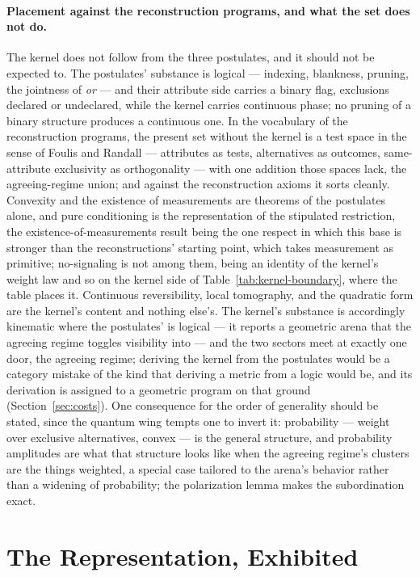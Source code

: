 \paragraph{Placement against the reconstruction programs, and what the set does not do.} The kernel does not follow from the three postulates, and it should not be expected to. The postulates' substance is logical --- indexing, blankness, pruning, the jointness of \emph{or} --- and their attribute side carries a binary flag, exclusions declared or undeclared, while the kernel carries continuous phase; no pruning of a binary structure produces a continuous one. In the vocabulary of the reconstruction programs, the present set without the kernel is a test space in the sense of Foulis and Randall --- attributes as tests, alternatives as outcomes, same-attribute exclusivity as orthogonality --- with one addition those spaces lack, the agreeing-regime union; and against the reconstruction axioms it sorts cleanly. Convexity and the existence of measurements are theorems of the postulates alone, and pure conditioning is the representation of the stipulated restriction, the existence-of-measurements result being the one respect in which this base is stronger than the reconstructions' starting point, which takes measurement as primitive; no-signaling is not among them, being an identity of the kernel's weight law and so on the kernel side of Table~\ref{tab:kernel-boundary}, where the table places it. Continuous reversibility, local tomography, and the quadratic form are the kernel's content and nothing else's. The kernel's substance is accordingly kinematic where the postulates' is logical --- it reports a geometric arena that the agreeing regime toggles visibility into --- and the two sectors meet at exactly one door, the agreeing regime; deriving the kernel from the postulates would be a category mistake of the kind that deriving a metric from a logic would be, and its derivation is assigned to a geometric program on that ground (Section~\ref{sec:costs}). One consequence for the order of generality should be stated, since the quantum wing tempts one to invert it: probability --- weight over exclusive alternatives, convex --- is the general structure, and probability amplitudes are what that structure looks like when the agreeing regime's clusters are the things weighted, a special case tailored to the arena's behavior rather than a widening of probability; the polarization lemma makes the subordination exact.

\section{The Representation, Exhibited}\label{sec:exhibits}

